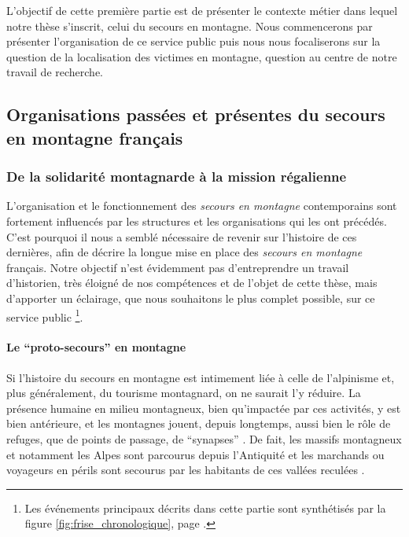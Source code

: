 
L'objectif de cette première partie est de présenter le contexte
métier dans lequel notre thèse s'inscrit, celui du secours en
montagne. Nous commencerons par présenter l'organisation de ce service
public puis nous nous focaliserons sur la question de la localisation
des victimes en montagne, question au centre de notre travail de
recherche.

\subsection{Organisations passées et présentes du secours en montagne
  français}
\label{subsec:1-1-1}

\subsubsection{De la solidarité montagnarde à la mission régalienne}
\label{subsubsec:1-1-1-1}

L'organisation et le fonctionnement des \emph{secours en montagne}
contemporains sont fortement influencés par les structures et les
organisations qui les ont précédés. C'est pourquoi il nous a semblé
nécessaire de revenir sur l'histoire de ces dernières, afin de décrire
la longue mise en place des \emph{secours en montagne} français. Notre
objectif n'est évidemment pas d'entreprendre un travail d'historien,
très éloigné de nos compétences et de l'objet de cette thèse, mais
d'apporter un éclairage, que nous souhaitons le plus complet possible,
sur ce service public \footnote{Les événements principaux décrits dans
  cette partie sont synthétisés par la figure
  \ref{fig:frise_chronologique}, page
  \pageref{fig:frise_chronologique}.}.

\paragraph{Le \enquote{proto-secours} en montagne}
\label{par:1-1-1-1-1}

Si l'histoire du secours en montagne est intimement liée à celle de
l'alpinisme et, plus généralement, du tourisme montagnard, on ne
saurait l'y réduire. La présence humaine en milieu montagneux, bien
qu'impactée par ces activités, y est bien antérieure, et les montagnes
jouent, depuis longtemps, aussi bien le rôle de refuges, que de points
de passage, de \enquote{synapses} \autocite[p. 337]{Brunet1992}. De
fait, les massifs montagneux et notamment les Alpes sont parcourus
depuis l'Antiquité et les marchands ou voyageurs en périls sont
secourus par les habitants de ces vallées reculées
\autocite{Mezin2016}.

